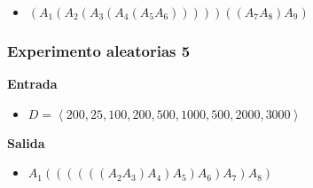 \documentclass[letter]{article}
\begin{document}
\begin{itemize}
    \item $(A_1(A_2(A_3(A_4(A_5A_6)))))((A_7A_8)A_9)$
\end{itemize}

\subsubsection{Experimento aleatorias 5}

\textbf{Entrada}

\begin{itemize}
    \item $D = \left< 200,25,100,200,500,1000,500,2000,3000 \right>$
\end{itemize}

\textbf{Salida}

\begin{itemize}
    \item $A_1((((((A_2A_3)A_4)A_5)A_6)A_7)A_8)$
\end{itemize}
\end{document}
